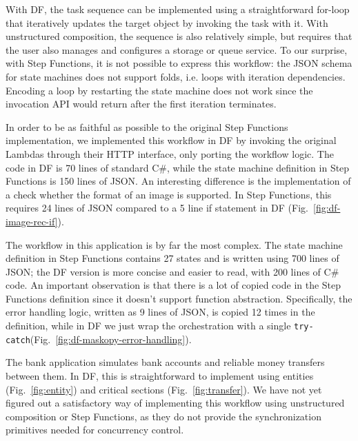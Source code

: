%
With DF, the task sequence can be implemented using a straightforward for-loop that iteratively updates the target object by invoking the task with it. With unstructured composition, the sequence is also relatively simple, but requires that the user also manages and configures a storage or queue service. To our surprise, with Step Functions, it is not possible to express this workflow: the JSON schema for state machines does not support folds, i.e. loops with iteration dependencies. Encoding a loop by restarting the state machine does not work since the invocation API would return after the first iteration terminates. 


%
In order to be as faithful as possible to the original Step Functions implementation, we implemented this workflow in DF by invoking the original Lambdas through their HTTP interface, only porting the workflow logic. The code in DF is 70 lines of standard C\#, while the state machine definition in Step Functions is 150 lines of JSON. An interesting difference is the implementation of a check whether the format of an image is supported. In Step Functions, this requires 24 lines of JSON \str 
compared to a 5 line if statement in DF (Fig.~\ref{fig:df-image-rec-if}).

%
The workflow in this application is by far the most complex. The state machine definition in Step Functions contains 27 states and is written using 700 lines of JSON; the DF version is more concise and easier to read, with 200 lines of C\# code. An important observation is that there is a lot of copied code in the Step Functions definition since it doesn't support function abstraction. Specifically, the error handling logic, written as 9 lines of JSON, is copied 12 times in the definition, while in DF we just wrap the orchestration with a single \texttt{try-catch}(Fig.~\ref{fig:df-maskopy-error-handling}).

%
The bank application simulates bank accounts and reliable money transfers between them. In DF, this is straightforward to implement using entities (Fig.~\ref{fig:entity}) and critical sections (Fig.~\ref{fig:transfer}). We have not yet figured out a satisfactory way of implementing this workflow using unstructured composition or Step Functions, as they do not provide the synchronization primitives needed for concurrency control.


